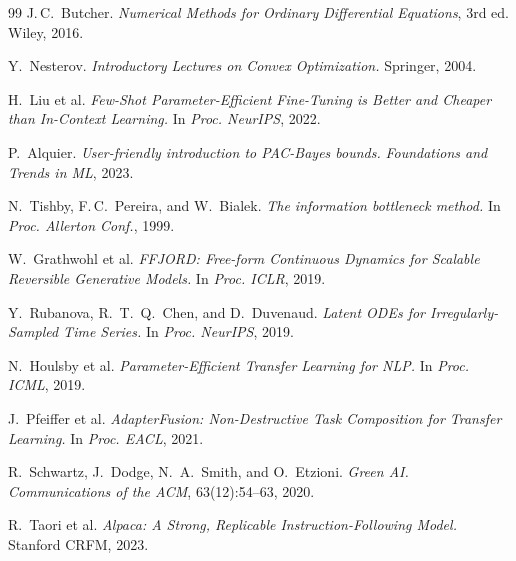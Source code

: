 \documentclass[conference]{IEEEtran}
\begin{document}
\begin{thebibliography}{99}
J.\,C.~Butcher.
\textit{Numerical Methods for Ordinary Differential Equations}, 3rd ed.
Wiley, 2016.

Y.~Nesterov.
\textit{Introductory Lectures on Convex Optimization.}
Springer, 2004.

H.~Liu et al.
\textit{Few-Shot Parameter-Efficient Fine-Tuning is Better and Cheaper than In-Context Learning.}
In \textit{Proc. NeurIPS}, 2022.

P.~Alquier.
\textit{User-friendly introduction to PAC-Bayes bounds.}
\textit{Foundations and Trends in ML}, 2023.

N.~Tishby, F.\,C.~Pereira, and W.~Bialek.
\textit{The information bottleneck method.}
In \textit{Proc. Allerton Conf.}, 1999.

W.~Grathwohl et al.
\textit{FFJORD: Free-form Continuous Dynamics for Scalable Reversible Generative Models.}
In \textit{Proc. ICLR}, 2019.

Y.~Rubanova, R.~T.~Q.~Chen, and D.~Duvenaud.
\textit{Latent ODEs for Irregularly-Sampled Time Series.}
In \textit{Proc. NeurIPS}, 2019.

N.~Houlsby et al.
\textit{Parameter-Efficient Transfer Learning for NLP.}
In \textit{Proc. ICML}, 2019.

J.~Pfeiffer et al.
\textit{AdapterFusion: Non-Destructive Task Composition for Transfer Learning.}
In \textit{Proc. EACL}, 2021.

R.~Schwartz, J.~Dodge, N.~A.~Smith, and O.~Etzioni.
\textit{Green AI.}
\textit{Communications of the ACM}, 63(12):54--63, 2020.

R.~Taori et al.
\textit{Alpaca: A Strong, Replicable Instruction-Following Model.}
Stanford CRFM, 2023.

\end{thebibliography}
\end{document}
